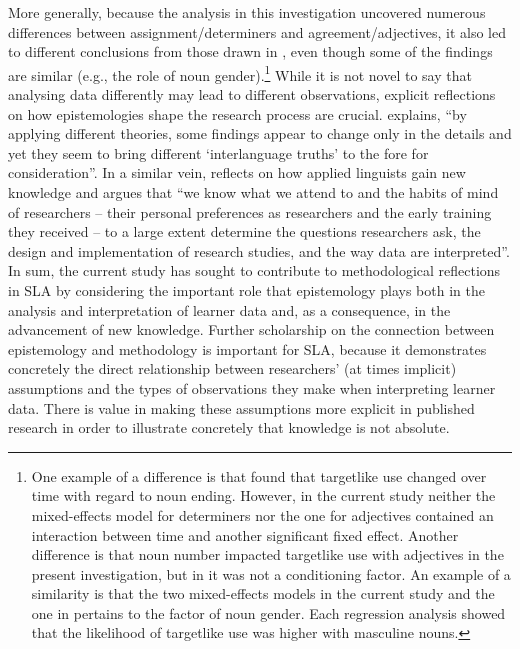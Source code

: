 \documentclass[output=paper,colorlinks,citecolor=brown,modfonts,nonflat]{../langscibook}
\begin{document}
More generally, because the analysis in this investigation uncovered numerous differences between assignment\slash determiners and agreement{\slash}adjec\-tives, it also led to different conclusions from those drawn in \citet{GudmestadEtAl2019}, even though some of the findings are similar (e.g., the role of noun gender).\footnote{{One example of a difference is that \citet{GudmestadEtAl2019} found that targetlike use changed over time with regard to noun ending. However, in the current study neither the mixed-effects model for determiners nor the one for adjectives contained an interaction between time and another significant fixed effect. Another difference is that noun number impacted targetlike use with adjectives in the present investigation, but in \citeauthor{GudmestadEtAl2019} it was not a conditioning factor. An example of a similarity is that the two mixed-effects models in the current study and the one in \citeauthor{GudmestadEtAl2019} pertains to the factor of noun gender. Each regression analysis showed that the likelihood of targetlike use was higher with masculine nouns.}} While it is not novel to say that analysing data differently may lead to different observations, explicit reflections on how epistemologies shape the research process are crucial. \citet[194]{Ortega2014trying} explains, “by applying different theories, some findings appear to change only in the details and yet they seem to bring different `interlanguage truths' to the fore for consideration”. In a similar vein, \citet[48]{Young2018} reflects on how applied linguists gain new knowledge and argues that “we know what we attend to and the habits of mind of researchers – their personal preferences as researchers and the early training they received – to a large extent determine the questions researchers ask, the design and implementation of research studies, and the way data are interpreted”. In sum, the current study has sought to contribute to methodological reflections in SLA by considering the important role that epistemology plays both in the analysis and interpretation of learner data and, as a consequence, in the advancement of new knowledge. Further scholarship on the connection between epistemology and methodology is important for SLA, because it demonstrates concretely the direct relationship between researchers’ (at times implicit) assumptions and the types of observations they make when interpreting learner data. There is value in making these assumptions more explicit in published research in order to illustrate concretely that knowledge is not absolute.

{\sloppy\printbibliography[heading=subbibliography,notkeyword=this]}
\end{document}
